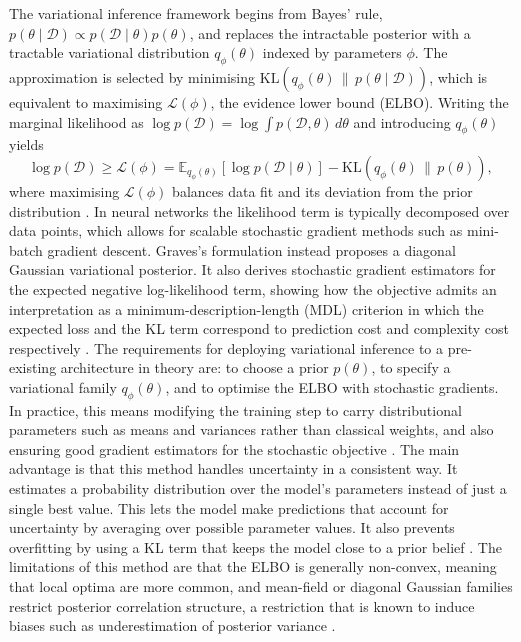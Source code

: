 The variational inference framework begins from Bayes' rule, $p(\theta\mid\mathcal{D})\propto p(\mathcal{D}\mid\theta)p(\theta)$, and replaces the intractable posterior with a tractable variational distribution $q_\phi(\theta)$ indexed by parameters $\phi$. The approximation is selected by minimising $\mathrm{KL}(q_\phi(\theta)\,\|\,p(\theta\mid \mathcal{D}))$, which is equivalent to maximising \(\mathcal{L}(\phi)\), the evidence lower bound (ELBO). Writing the marginal likelihood as $\log p(\mathcal{D}) = \log \int p(\mathcal{D},\theta)\, d\theta$ and introducing $q_\phi(\theta)$ yields
\begin{equation}
\log p(\mathcal{D}) \ge 
\mathcal{L}(\phi)
=
\mathbb{E}_{q_\phi(\theta)}\!\left[\log p(\mathcal{D}\mid\theta)\right] 
-
\mathrm{KL}\!\left(q_\phi(\theta)\,\|\,p(\theta)\right),
\end{equation}
where maximising $\mathcal{L}(\phi)$ balances data fit and its deviation from the prior distribution \cite{Blei2018vi,Graves2011vi}. In neural networks the likelihood term is typically decomposed over data points, which allows for scalable stochastic gradient methods such as mini-batch gradient descent. Graves's formulation instead proposes a diagonal Gaussian variational posterior. It also derives stochastic gradient estimators for the expected negative log-likelihood term, showing how the objective admits an interpretation as a minimum-description-length (MDL) criterion in which the expected loss and the KL term correspond to prediction cost and complexity cost respectively \cite{Graves2011vi}. The requirements for deploying variational inference to a pre-existing architecture in theory are: to choose a prior $p(\theta)$, to specify a variational family $q_\phi(\theta)$, and to optimise the ELBO with stochastic gradients. In practice, this means modifying the training step to carry distributional parameters such as means and variances rather than classical weights, and also ensuring good gradient estimators for the stochastic objective \cite{Graves2011vi,Blei2018vi}. The main advantage is that this method handles uncertainty in a consistent way. It estimates a probability distribution over the model's parameters instead of just a single best value. This lets the model make predictions that account for uncertainty by averaging over possible parameter values. It also prevents overfitting by using a KL term that keeps the model close to a prior belief \cite{Graves2011vi,Blei2018vi}. The limitations of this method are that the ELBO is generally non-convex, meaning that local optima are more common, and mean-field or diagonal Gaussian families restrict posterior correlation structure, a restriction that is known to induce biases such as underestimation of posterior variance \cite{Blei2018vi}.

